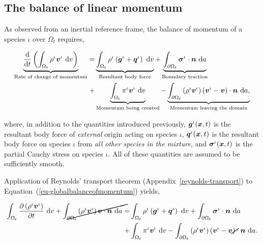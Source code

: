 \subsection{The balance of linear momentum}
\label{eu-balance-of-linear-momentum}

As observed from an inertial reference frame, the balance of momentum
of a species $\iota$ over $\Omega_{t}$ requires,

\begin{equation}
\begin{split}
\underbrace{\frac{\mathrm{d}}{\mathrm{d}t}\left(\int_{\Omega_{t}}
  \rho^{\iota} \mbox{\boldmath$ v$}^{\iota}\ \mathrm{d}v \right)}_{\text{Rate of change
    of momentum}} = & \underbrace{\int_{\Omega_{t}} \rho^{\iota}
  \left(\mbox{\boldmath$ g$}^{\iota} +
  \mbox{\boldmath$ q$}^{\iota}\right)\ \mathrm{d}v}_{\text{Resultant body force}} +
\underbrace{\int_{\partial \Omega_{t}}
  \mbox{\boldmath$\sigma$}^{\iota}\cdot\mbox{\boldmath$ n$}\ \mathrm{d}a}_{\text{Boundary traction}}\\ +
& \underbrace{\int_{\Omega_{t}}
  \pi^{\iota}\mbox{\boldmath$ v$}^{\iota}\ \mathrm{d}v}_{\text{Momentum being created}}
- \underbrace{\int_{\partial \Omega_{t}} \left(\rho^{\iota}
  \mbox{\boldmath$ v$}^{\iota} \right) \left(\mbox{\boldmath$ v$}^{\iota} - \mbox{\boldmath$ v$}\right) \cdot
  \mbox{\boldmath$ n$}\ \mathrm{d}a,}_{\text{Momentum leaving the domain}}
\end{split}
\label{eu-globalbalanceofmomentum}
\end{equation}

\noindent where, in addition to the quantities introduced previously,
$\mbox{\boldmath$ g$}^{\iota}(\mbox{\boldmath$ x$},t)$ is the resultant body force of {\em external} origin
acting on species $\iota$, $\mbox{\boldmath$ q$}^{\iota}(\mbox{\boldmath$ x$},t)$ is the resultant body
force on species $\iota$ from {\em all other species in the mixture},
and $\mbox{\boldmath$\sigma$}^{\iota}(\mbox{\boldmath$ x$},t)$ is the partial Cauchy stress on species
$\iota$. All of these quantities are assumed to be sufficiently
smooth.

Application of Reynolds' transport theorem
(Appendix~\ref{reynolds-transport}) to
Equation~(\ref{eu-globalbalanceofmomentum}) yields,

\begin{equation*}
\begin{split}
\int_{\Omega_{t}} \frac{\partial
  \left(\rho^{\iota}\bv^{\iota}\right)}{\partial t} \ \mathrm{d}v
+\cancel{\int_{\partial \Omega_{t}}
  \left(\rho^{\iota}\bv^{\iota}\right) \bv \cdot \bn\ \mathrm{d}a} = &
\int_{\Omega_{t}} \rho^{\iota} \left(\bg^{\iota}+\bq^{\iota}\right)
\ \mathrm{d}v + \int_{\partial \Omega_{t}}
\Bsigma^{\iota}\cdot\bn\ \mathrm{d}a\\ + & \int_{\Omega_{t}}
\pi^{\iota}\bv^{\iota} \ \mathrm{d}v - \int_{\partial \Omega_{t}}
\left(\rho^{\iota} \bv^{\iota} \right)\left(\bv^{\iota} -
\cancel{\bv}\right) \cdot \bn\ \mathrm{d}a.
\end{split}
\end{equation*}

